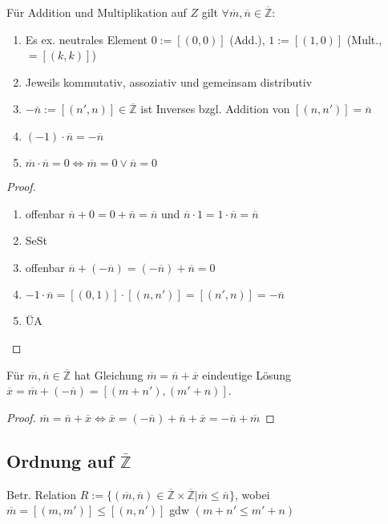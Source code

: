 \begin{proposition}
	Für Addition und Multiplikation auf $Z$ gilt $\forall \overline{m},\overline{n}\in\overline{\mathbb{Z}}$:
	\begin{enumerate}[label={\arabic*)}]
		\item Es ex. neutrales Element $0:=[(0,0)]$ (Add.), $1:=[(1,0)]$ (Mult., $=[(k,k)]$)
		\item Jeweils kommutativ, assoziativ und gemeinsam distributiv
		\item $-\overline{n} := [(n',n)]\in\overline{\mathbb{Z}}$ ist Inverses bzgl. Addition von $[(n,n')]=\overline{n}$
		\item $(-1)\cdot \overline{n} = -\overline{n}$
		\item $\overline{m}\cdot\overline{n} = 0 \Leftrightarrow \overline{m} = 0 \lor \overline{n} = 0$
	\end{enumerate}
\end{proposition}
\begin{proof}
	\begin{enumerate}[label={\arabic*)}]
		\item offenbar $\overline{n}+0=0+\overline{n}=\overline{n}$ und $\overline{n}\cdot 1=1\cdot \overline{n}=\overline{n}$
		\item SeSt
		\item offenbar $\overline{n}+(-\overline{n})=(-\overline{n})+\overline{n}=0$
		\item $-1\cdot\overline{n}=[(0,1)]\cdot[(n,n')]=[(n',n)]=-\overline{n}$
		\item ÜA
	\end{enumerate}
\end{proof}

\begin{proposition}
	Für $\overline{m},\overline{n}\in\overline{\mathbb{Z}}$ hat Gleichung $\overline{m} = \overline{n} + \overline{x}$ eindeutige Lösung $\overline{x} = \overline{m} + (-\overline{n}) = [(m+n'),(m'+n)]$.
\end{proposition}
\begin{proof}
	$\overline{m}=\overline{n}+\overline{x}\iff \overline{x}=(-\overline{n})+\overline{n}+\overline{x}=
	-\overline{n}+\overline{m}$
\end{proof}

\subsection{Ordnung auf $\overline{\mathbb{Z}}$}
\begin{*definition}
	Betr. Relation $R:=\{(\overline{m},\overline{n})\in\overline{\mathbb{Z}}\times\overline{\mathbb{Z}} | \overline{m} \le \overline{n}\}$, wobei $\overline{m} = [(m,m')] \le [(n,n')]$ \gls{gdw} $(m+n'\le m'+n)$
\end{*definition}

